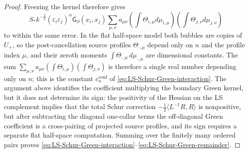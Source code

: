\documentclass[11pt,reqno,a4paper]{amsart}
\numberwithin{equation}{section}
\theoremstyle{plain}
\theoremstyle{remark}
\theoremstyle{plain}
\begin{document}
\begin{proof}
Freezing the kernel therefore gives
\[
S_\ast k^{-\frac2q}
(\varepsilon_i\varepsilon_j)^\alpha
\mathsf G_\partial(x_i,x_j)
\sum_{\mu,\nu}a_{\mu\nu}
\left(\int\Theta_{i,\mu}d\mu_{i,\mu}\right)
\left(\int\Theta_{j,\nu}d\mu_{j,\nu}\right)
\]
to within the same error.  In the flat half-space model both bubbles are
copies of $U_+$, so the post-cancellation source profiles $\Theta_{\cdot,\mu}$
depend only on $n$ and the profile index $\mu$, and their zeroth moments
$\int\Theta_{\cdot,\mu}\,d\mu_{\cdot,\mu}$ are dimensional constants.  The sum
$\sum_{\mu,\nu}a_{\mu\nu}(\int\Theta_{i,\mu})(\int\Theta_{j,\nu})$ is
therefore a single real number depending only on $n$; this is the constant
$c_n^{\mathrm{conf}}$ of \eqref{eq:LS-Schur-Green-interaction}.  The argument above identifies the
coefficient multiplying the boundary Green kernel, but it does not determine
its sign: the positivity of the Hessian on the LS complement implies that the
total Schur correction $-\frac12\langle L^{-1}R,R\rangle$ is nonpositive,
but after subtracting the diagonal one-collar terms the off-diagonal Green
coefficient is a cross-pairing of projected source profiles, and its sign
requires a separate flat half-space computation.
Summing over the finitely many ordered pairs proves
\eqref{eq:LS-Schur-Green-interaction}--\eqref{eq:LS-Schur-Green-remainder}.
\end{proof}
\end{document}

